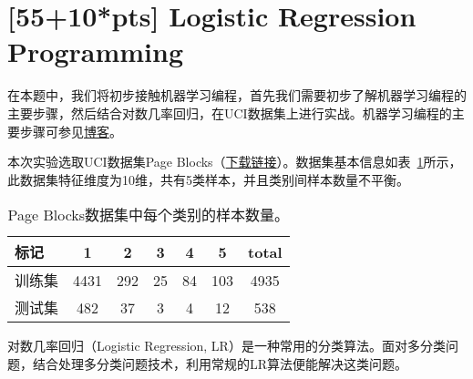 \documentclass[a4paper,UTF8]{article}
\numberwithin{equation}{section}
\begin{document}
\section{[55+10*pts] Logistic Regression Programming}
在本题中，我们将初步接触机器学习编程，首先我们需要初步了解机器学习编程的主要步骤，然后结合对数几率回归，在UCI数据集上进行实战。机器学习编程的主要步骤可参见\href{http://blog.csdn.net/cqy_chen/article/details/78690975}{博客}。

本次实验选取UCI数据集Page Blocks（\href{http://lamda.nju.edu.cn/ml2018/PS2/PS2_dataset.zip}{下载链接}）。数据集基本信息如表~\ref{data_inf}所示，此数据集特征维度为10维，共有5类样本，并且类别间样本数量不平衡。

\begin{table}[!h]
	\centering
	\caption{Page Blocks数据集中每个类别的样本数量。}\vspace{3mm}
	\label{data_inf}
	\begin{tabular}{l|cccccc}\hline
		标记     & 1    & 2   & 3  & 4  & 5   & total \\ \hline
		训练集   & 4431 & 292 & 25 & 84 & 103 & 4935  \\
		测试集   & 482  & 37  & 3  & 4  & 12  & 538   \\ \hline
	\end{tabular}
\end{table}

对数几率回归（Logistic Regression, LR）是一种常用的分类算法。面对多分类问题，结合处理多分类问题技术，利用常规的LR算法便能解决这类问题。
\end{document}

